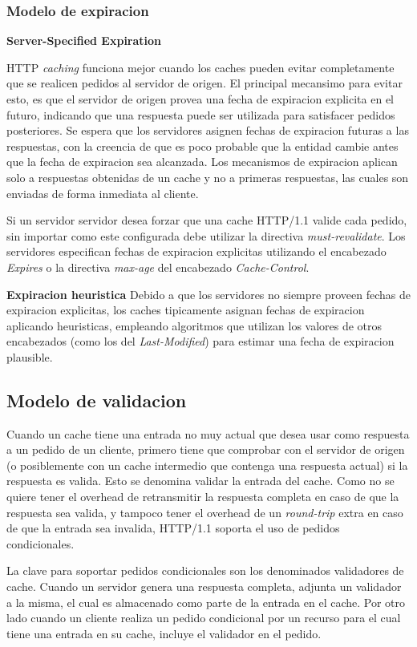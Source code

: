 \subsubsection{Modelo de expiracion}
\textbf{Server-Specified Expiration}

HTTP \emph{caching} funciona mejor cuando los caches pueden evitar completamente que se realicen pedidos al servidor de origen. El principal mecansimo para evitar esto, es que el servidor
de origen provea una fecha de expiracion explicita en el futuro, indicando que una respuesta puede ser utilizada para satisfacer pedidos posteriores. Se espera que los
servidores asignen fechas de expiracion futuras a las respuestas, con la creencia de que es poco probable que la entidad cambie antes que la fecha de expiracion sea alcanzada.
Los mecanismos de expiracion aplican solo a respuestas obtenidas de un cache y no a primeras respuestas, las cuales son enviadas de forma inmediata al cliente.

Si un servidor servidor desea forzar que una cache HTTP/1.1 valide cada pedido, sin importar como este configurada debe utilizar la directiva \emph{must-revalidate}.
Los servidores especifican fechas de expiracion explicitas utilizando el encabezado \emph{Expires} o la directiva \emph{max-age} del encabezado \emph{Cache-Control}.

\textbf{Expiracion heuristica}
Debido a que los servidores no siempre proveen fechas de expiracion explicitas, los caches tipicamente asignan fechas de expiracion aplicando heuristicas, empleando
algoritmos que utilizan los valores de otros encabezados (como los del \emph{Last-Modified}) para estimar una fecha de expiracion plausible.

\subsection{Modelo de validacion}
Cuando un cache tiene una entrada no muy actual que desea usar como respuesta a un pedido de un cliente, primero tiene que comprobar con el servidor de origen
(o posiblemente con un cache intermedio que contenga una respuesta actual) si la respuesta es valida. Esto se denomina validar la entrada del cache. Como no se quiere tener el overhead
de retransmitir la respuesta completa en caso de que la respuesta sea valida, y tampoco tener el overhead de un \emph{round-trip} extra en caso de que la entrada sea
invalida, HTTP/1.1 soporta el uso de pedidos condicionales.

La clave para soportar pedidos condicionales son los denominados validadores de cache. Cuando un servidor genera una respuesta completa, adjunta un validador a la misma,
el cual es almacenado como parte de la entrada en el cache. Por otro lado cuando un cliente realiza un pedido condicional por un recurso para el cual tiene una entrada
en su cache, incluye el validador en el pedido.

